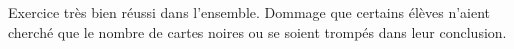 Exercice très bien réussi dans l'ensemble. Dommage que certains élèves n'aient cherché que le nombre de cartes noires ou se soient trompés dans leur conclusion.